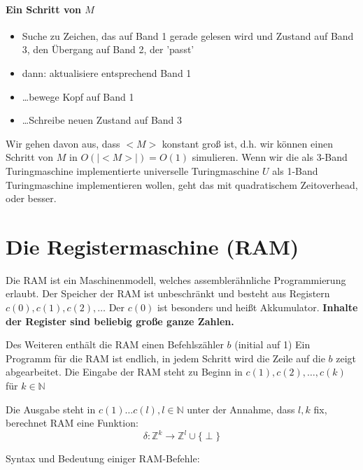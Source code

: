 \paragraph*{Ein Schritt von $M$}
\begin{itemize}
	\item Suche zu Zeichen, das auf Band 1 gerade gelesen wird und Zustand auf Band 3, den Übergang auf Band 2, der 'passt'
	\item dann: aktualisiere entsprechend Band 1
	\item \dots bewege Kopf auf Band 1
	\item \dots Schreibe neuen Zustand auf Band 3
\end{itemize}

Wir gehen davon aus, dass $<M>$ konstant groß ist, d.h. wir können einen Schritt von $M$ in $O(|<M>|)=O(1)$ simulieren. Wenn wir die als 3-Band Turingmaschine implementierte universelle Turingmaschine $U$ als 1-Band Turingmaschine implementieren wollen, geht das mit quadratischem Zeitoverhead, oder besser.

\section{Die Registermaschine (RAM)}
Die RAM ist ein Maschinenmodell, welches assemblerähnliche Programmierung erlaubt. Der Speicher der RAM ist unbeschränkt und besteht aus Registern $c(0),c(1),c(2),\dots$ Der $c(0)$ ist besonders und heißt Akkumulator. \textbf{Inhalte der Register sind beliebig große ganze Zahlen.}

\par\medskip
Des Weiteren enthält die RAM einen Befehlszähler $b$ (initial auf 1) %
Ein Programm für die RAM ist endlich, in jedem Schritt wird die Zeile auf die $b$ zeigt abgearbeitet. Die Eingabe der RAM steht zu Beginn in $c(1),c(2),\dots,c(k)$ für $k \in \mathbb{N}$\par\medskip

Die Ausgabe steht in $c(1)\dots c(l), l \in \mathbb{N}$ unter der Annahme, dass $l,k$ fix, berechnet RAM eine Funktion: $$\delta:\mathbb{Z}^k \rightarrow \mathbb{Z}^l \cup \{ \perp \}$$\par\medskip %

Syntax und Bedeutung einiger RAM-Befehle:\par\medskip

